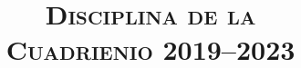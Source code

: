 \documentclass[twocolumn]{article}
\title{
    \textsc{Disciplina de la \LMJ{}}\\
    \textsc{Cuadrienio 2019--2023}
}
\author{}
\date{}
\begin{document}
    \maketitle
    \tableofcontents
    \bigbreak
    
    
    
    
    
    
    
\end{document}
